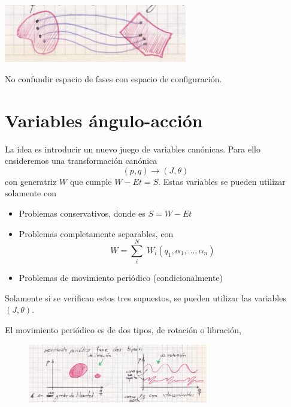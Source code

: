 \documentclass[10pt,oneside]{CBFT_book}
\begin{document}
\includegraphics[width=0.6\textwidth]{images/fig_mc_espacio_fases.jpg}	

No confundir espacio de fases con espacio de configuración.

\section{Variables ángulo-acción}

La idea es introducir un nuevo juego de variables canónicas. Para ello cnsideremos una transformación 
canónica 
\[
	(p, q) \longrightarrow (J, \theta)
\]
con generatriz $W$ que cumple $W-Et=S$. 
Estas variables se pueden utilizar solamente con
\begin{itemize}
	\item Problemas conservativos, donde es $S = W - Et $
	\item Problemas completamente separables, con
	\[
		W = \sum_i^N \; W_i(q_1,\alpha_1,...,\alpha_n)
	\]
	\item Problemas de movimiento periódico (condicionalmente)
\end{itemize}

Solamente si se verifican estos tres supuestos, se pueden utilizar las variables $(J,\theta)$.

El movimiento periódico es de dos tipos, de rotación o libración,

\begin{figure}[htb]
	\begin{center}
	\includegraphics[width=0.7\textwidth]{images/fig_mc_rot_lib.jpg}	 
	\end{center}
	\caption{}
\end{figure} 
\end{document}
